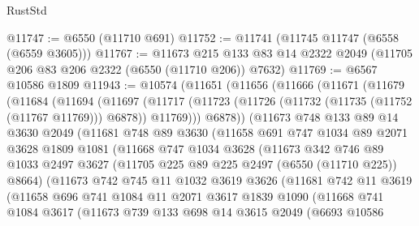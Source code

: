 \begin{lexlean}{RustStd}
\begin{coremodule}
@11747 := @6550 (@11710 @691)
@11752 := @11741 (@11745 @11747 (@6558 (@6559 @3605)))
@11767 := @11673
    @215
    @133
    @83
    @14
    @2322
    @2049
    (@11705 @206 @83 @206 @2322 (@6550 (@11710 @206)) @7632)
@11769 := @6567 @10586 @1809
@11943 := @10574
    (@11651
      (@11656
        (@11666
          (@11671
            (@11679
              (@11684
                (@11694
                  (@11697
                    (@11717
                      (@11723 (@11726 (@11732 (@11735 (@11752 (@11767 @11769))) @6878)) @11769)))
                  @6878))
              (@11673
                @748
                @133
                @89
                @14
                @3630
                @2049
                (@11681
                  @748
                  @89
                  @3630
                  (@11658
                    @691
                    @747
                    @1034
                    @89
                    @2071
                    @3628
                    @1809
                    @1081
                    (@11668
                      @747
                      @1034
                      @3628
                      (@11673
                        @342
                        @746
                        @89
                        @1033
                        @2497
                        @3627
                        (@11705 @225 @89 @225 @2497 (@6550 (@11710 @225)) @8664)
                        (@11673
                          @742
                          @745
                          @11
                          @1032
                          @3619
                          @3626
                          (@11681
                            @742
                            @11
                            @3619
                            (@11658
                              @696
                              @741
                              @1084
                              @11
                              @2071
                              @3617
                              @1839
                              @1090
                              (@11668
                                @741
                                @1084
                                @3617
                                (@11673
                                  @739
                                  @133
                                  @698
                                  @14
                                  @3615
                                  @2049
                                  (@6693
                                    @10586

\end{coremodule}
\end{lexlean}
